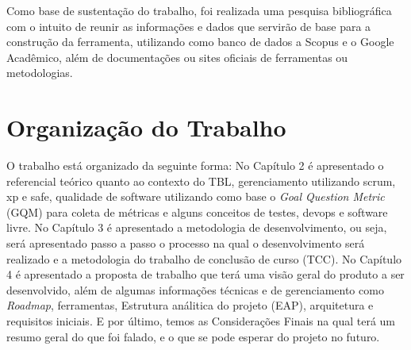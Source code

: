 Como base de sustentação do trabalho, foi realizada uma pesquisa bibliográfica com o intuito de reunir as informações e dados que servirão de base para a construção da ferramenta, utilizando como banco de dados a Scopus e o Google Acadêmico, além de documentações ou sites oficiais de ferramentas ou metodologias.

\section{Organização do Trabalho}

O trabalho está organizado da seguinte forma: No Capítulo 2 é apresentado o referencial teórico quanto ao contexto do TBL, gerenciamento utilizando scrum, xp e safe, qualidade de software utilizando como base o \textit{Goal Question Metric} (GQM) para coleta de métricas e alguns conceitos de testes, devops e software livre. No Capítulo 3 é apresentado a metodologia de desenvolvimento, ou seja, será apresentado passo a passo o processo na qual o desenvolvimento será realizado e a metodologia do trabalho de conclusão de curso (TCC). No Capítulo 4 é apresentado a proposta de trabalho que terá uma visão geral do produto a ser desenvolvido, além de algumas informações técnicas e de gerenciamento como \textit{Roadmap}, ferramentas, Estrutura análitica do projeto (EAP), arquitetura e requisitos iniciais. E por último, temos as Considerações Finais na qual terá um resumo geral do que foi falado, e o que se pode esperar do projeto no futuro.
